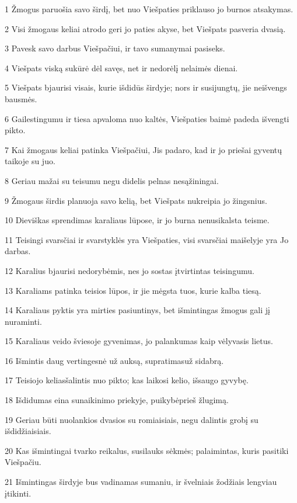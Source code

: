 \par 1 Žmogus paruošia savo širdį, bet nuo Viešpaties priklauso jo burnos atsakymas. 
\par 2 Visi žmogaus keliai atrodo geri jo paties akyse, bet Viešpats pasveria dvasią. 
\par 3 Pavesk savo darbus Viešpačiui, ir tavo sumanymai pasiseks. 
\par 4 Viešpats viską sukūrė dėl savęs, net ir nedorėlį nelaimės dienai. 
\par 5 Viešpats bjaurisi visais, kurie išdidūs širdyje; nors ir susijungtų, jie neišvengs bausmės. 
\par 6 Gailestingumu ir tiesa apvaloma nuo kaltės, Viešpaties baimė padeda išvengti pikto. 
\par 7 Kai žmogaus keliai patinka Viešpačiui, Jis padaro, kad ir jo priešai gyventų taikoje su juo. 
\par 8 Geriau mažai su teisumu negu didelis pelnas nesąžiningai. 
\par 9 Žmogaus širdis planuoja savo kelią, bet Viešpats nukreipia jo žingsnius. 
\par 10 Dieviškas sprendimas karaliaus lūpose, ir jo burna nenusikalsta teisme. 
\par 11 Teisingi svarsčiai ir svarstyklės yra Viešpaties, visi svarsčiai maišelyje yra Jo darbas. 
\par 12 Karalius bjaurisi nedorybėmis, nes jo sostas įtvirtintas teisingumu. 
\par 13 Karaliams patinka teisios lūpos, ir jie mėgsta tuos, kurie kalba tiesą. 
\par 14 Karaliaus pyktis yra mirties pasiuntinys, bet išmintingas žmogus gali jį nuraminti. 
\par 15 Karaliaus veido šviesoje gyvenimas, jo palankumas kaip vėlyvasis lietus. 
\par 16 Išmintis daug vertingesnė už auksą, supratimas­už sidabrą. 
\par 17 Teisiojo kelias­šalintis nuo pikto; kas laikosi kelio, išsaugo gyvybę. 
\par 18 Išdidumas eina sunaikinimo priekyje, puikybė­prieš žlugimą. 
\par 19 Geriau būti nuolankios dvasios su romiaisiais, negu dalintis grobį su išdidžiaisiais. 
\par 20 Kas išmintingai tvarko reikalus, susilauks sėkmės; palaimintas, kuris pasitiki Viešpačiu. 
\par 21 Išmintingas širdyje bus vadinamas sumaniu, ir švelniais žodžiais lengviau įtikinti. 
